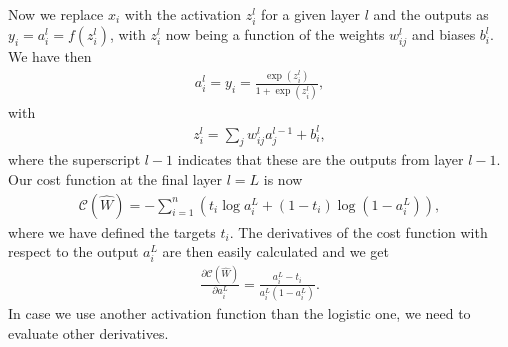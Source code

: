 \documentclass[letterpaper,10pt,english]{sphinxmanual}
\begin{document}
Now we replace \(x_i\) with the activation \(z_i^l\) for a given layer \(l\) and the outputs as \(y_i=a_i^l=f(z_i^l)\), with \(z_i^l\) now being a function of the weights \(w_{ij}^l\) and biases \(b_i^l\).
We have then
\begin{equation*}
\begin{split}
a_i^l = y_i = \frac{\exp{(z_i^l)}}{1+\exp{(z_i^l)}},
\end{split}
\end{equation*}
with
\begin{equation*}
\begin{split}
z_i^l = \sum_{j}w_{ij}^l a_j^{l-1}+b_i^l,
\end{split}
\end{equation*}
where the superscript \(l-1\) indicates that these are the outputs from layer \(l-1\).
Our cost function at the final layer \(l=L\) is now
\begin{equation*}
\begin{split}
\mathcal{C}(\hat{W}) = - \sum_{i=1}^n \left(t_i\log{a_i^L}+(1-t_i)\log{(1-a_i^L)}\right),
\end{split}
\end{equation*}
where we have defined the targets \(t_i\). The derivatives of the cost function with respect to the output \(a_i^L\) are then easily calculated and we get
\begin{equation*}
\begin{split}
\frac{\partial \mathcal{C}(\hat{W})}{\partial a_i^L} = \frac{a_i^L-t_i}{a_i^L(1-a_i^L)}.
\end{split}
\end{equation*}
In case we use another activation function than the logistic one, we need to evaluate other derivatives.
\end{document}
